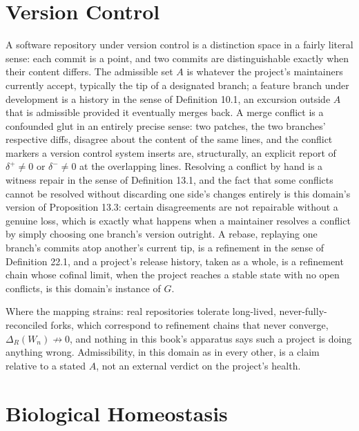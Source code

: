 \documentclass[11pt]{book}
\begin{document}
\section*{Version Control}

A software repository under version control is a distinction space in a fairly literal sense: each commit is a point, and two commits are distinguishable exactly when their content differs. The admissible set $A$ is whatever the project's maintainers currently accept, typically the tip of a designated branch; a feature branch under development is a history in the sense of Definition 10.1, an excursion outside $A$ that is admissible provided it eventually merges back. A merge conflict is a confounded glut in an entirely precise sense: two patches, the two branches' respective diffs, disagree about the content of the same lines, and the conflict markers a version control system inserts are, structurally, an explicit report of $\delta^+ \neq 0$ or $\delta^- \neq 0$ at the overlapping lines. Resolving a conflict by hand is a witness repair in the sense of Definition 13.1, and the fact that some conflicts cannot be resolved without discarding one side's changes entirely is this domain's version of Proposition 13.3: certain disagreements are not repairable without a genuine loss, which is exactly what happens when a maintainer resolves a conflict by simply choosing one branch's version outright. A rebase, replaying one branch's commits atop another's current tip, is a refinement in the sense of Definition 22.1, and a project's release history, taken as a whole, is a refinement chain whose cofinal limit, when the project reaches a stable state with no open conflicts, is this domain's instance of $G$.

Where the mapping strains: real repositories tolerate long-lived, never-fully-reconciled forks, which correspond to refinement chains that never converge, $\Delta_R(W_n) \not\to 0$, and nothing in this book's apparatus says such a project is doing anything wrong. Admissibility, in this domain as in every other, is a claim relative to a stated $A$, not an external verdict on the project's health.

\section*{Biological Homeostasis}
\end{document}
